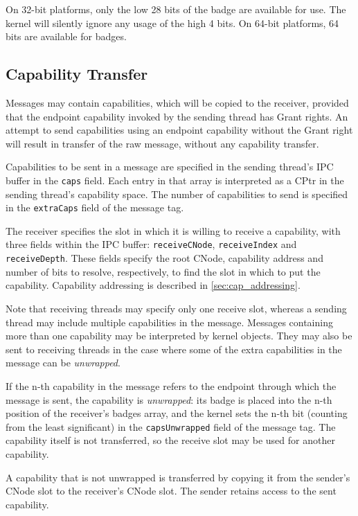 On 32-bit platforms, only the low 28 bits of the badge are available for use.
The kernel will silently ignore any usage of the high 4 bits.
On 64-bit platforms, 64 bits are available for badges.

\subsection{Capability Transfer}
\label{sec:cap-transfer}

Messages may contain capabilities, which will be copied to the
receiver, provided that the endpoint capability
invoked by the sending thread has Grant rights. An attempt to send
capabilities using an endpoint capability without the Grant right will
result in transfer of the raw message, without any capability transfer.

Capabilities to be sent in a message are specified in the sending thread's
IPC buffer in the \texttt{caps} field. Each entry in that array is interpreted
as a CPtr in the sending thread's capability space. The number of capabilities
to send is specified in the \texttt{extraCaps} field of the message tag.

The receiver specifies the slot
in which it is willing to receive a capability, with three fields within the IPC buffer: \texttt{receiveCNode}, \texttt{receiveIndex} and \texttt{receiveDepth}.
These fields specify the root CNode, capability address and number of bits to resolve, respectively, to find
the slot in which to put the capability. Capability
addressing is described in \autoref{sec:cap_addressing}.

Note that receiving threads may specify only one receive slot, whereas a
sending thread may include multiple capabilities in the message. Messages
containing more than one capability may be interpreted by kernel objects. They
may also be sent to receiving threads in the case where some of the extra
capabilities in the message can be \emph{unwrapped}.

If the n-th capability in the message refers to the endpoint through
which the message is sent, the capability is \emph{unwrapped}: its badge is placed into
the n-th
position of the receiver's badges array, and the kernel sets the n-th bit (counting from the
least significant) in the \texttt{capsUnwrapped} field of the message
tag. The capability itself is not transferred, so the receive slot may be used
for another capability.

A capability that is not unwrapped is transferred by copying it from the
sender's CNode slot to the receiver's CNode slot. The sender retains access
to the sent capability.

